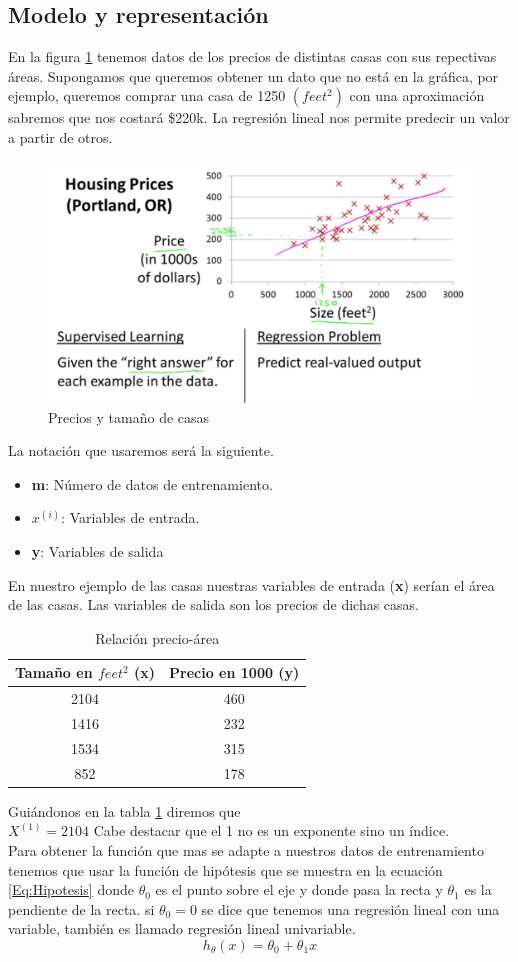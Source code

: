 \documentclass{book}
\begin{document}
\subsection{Modelo y representación}
En la figura \ref{Fig:MR1} tenemos datos de los precios de distintas casas con sus repectivas áreas. Supongamos que queremos obtener un dato que no está en la gráfica, por ejemplo, queremos comprar una casa de 1250 $(feet^2)$ con una aproximación sabremos que nos costará \$220k. 
La regresión lineal nos permite predecir un valor a partir de otros.
\begin{figure}
	\centering
	\includegraphics[scale=0.25]{img/MR1}
	\caption{Precios y tamaño de casas}
	\label{Fig:MR1}
\end{figure}
La notación que usaremos será la siguiente.
\begin{itemize}
	\item \textbf{m}: Número de datos de entrenamiento.
	\item \textbf{$x^{(i)}$}: Variables de entrada.
	\item \textbf{y}: Variables de salida
\end{itemize}
En nuestro ejemplo de las casas nuestras variables de entrada (\textbf{x}) serían el área de las casas. Las variables de salida son los precios de dichas casas.
\begin{table}
	\centering
	\begin{tabular}{c|c}
		Tamaño en $feet^2$ (x) & Precio en 1000 (y)\\
		\hline
		2104&460\\
		1416&232\\
		1534&315\\
		852&178
	\end{tabular}
\caption{Relación precio-área}
\label{Tab:TP}
\end{table}
Guiándonos en la tabla \ref{Tab:TP} diremos que\\$X^{(1)}=2104$ Cabe destacar que el 1 no es un exponente sino un índice.\\
Para obtener la función que mas se adapte a nuestros datos de entrenamiento tenemos que usar la función de hipótesis que se muestra en la ecuación \ref{Eq:Hipotesis} donde $\theta_0$ es el punto sobre el eje y donde pasa la recta y $\theta_1$ es la pendiente de la recta. si $\theta_0=0$ se dice que tenemos una regresión lineal con una variable, también es llamado regresión lineal univariable. 
\begin{equation}
	h_\theta(x)=\theta_0+\theta_1x
	\label{Eq:Hipotesis}
\end{equation}
\end{document}
